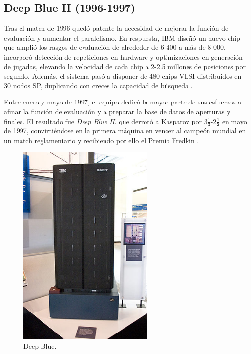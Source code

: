 \documentclass[a4paper, 12pt]{article}
\begin{document}
\subsection{Deep Blue II (1996-1997)}

Tras el match de 1996 quedó patente la necesidad de mejorar la 
función de evaluación y aumentar el paralelismo. En respuesta, 
IBM diseñó un nuevo chip que amplió los rasgos de evaluación de 
alrededor de 6 400 a más de 8 000, incorporó detección de 
repeticiones en hardware y optimizaciones en generación de 
jugadas, elevando la velocidad de cada chip a 2-2.5 millones de 
posiciones por segundo. Además, el sistema pasó a disponer de 
480 chips VLSI distribuidos en 30 nodos SP, duplicando con 
creces la capacidad de búsqueda \cite{Campbell2002}.

Entre enero y mayo de 1997, el equipo dedicó la mayor parte de 
sus esfuerzos a afinar la función de evaluación y a preparar la 
base de datos de aperturas y finales. El resultado fue 
\textit{Deep Blue II}, que derrotó a Kasparov por 3\(\frac{1}{2}\)-2\(\frac{1}{2}\) en mayo
de 1997, convirtiéndose en la primera máquina en vencer al 
campeón mundial en un match reglamentario y recibiendo por 
ello el Premio Fredkin \cite{Campbell2002}.



\begin{figure}[h]
    \centering
    \includegraphics[width=0.6\textwidth]{assets/deepblue.jpg}
    \caption{Deep Blue.}
    \label{fig:deepblue}
\end{figure}
\end{document}
